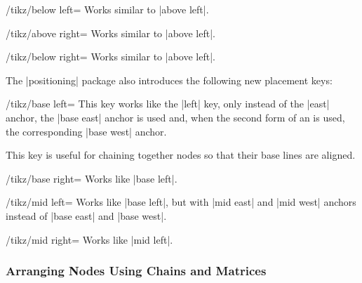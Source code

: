 \begin{key}{/tikz/below left=}
  Works similar to |above left|.
\end{key}
\begin{key}{/tikz/above right=}
  Works similar to |above left|.
\end{key}
\begin{key}{/tikz/below right=}
  Works similar to |above left|.
\end{key}

The |positioning| package also introduces the following new placement
keys:
\begin{key}{/tikz/base left=}
  This key works like the |left| key, only instead of the |east| anchor,
  the |base east| anchor is used and, when the second form of an
   is used, the corresponding |base west| anchor.

  This key is useful for chaining together nodes so that their base
  lines are aligned.
\begin{codeexample}[]
\end{codeexample}
\end{key}
\begin{key}{/tikz/base right=}
  Works like |base left|.
\end{key}
\begin{key}{/tikz/mid left=}
  Works like |base left|, but with |mid east| and |mid west| anchors
  instead of |base east| and |base west|.
\end{key}
\begin{key}{/tikz/mid right=}
  Works like |mid left|.
\end{key}




\subsubsection{Arranging Nodes Using Chains and Matrices}

